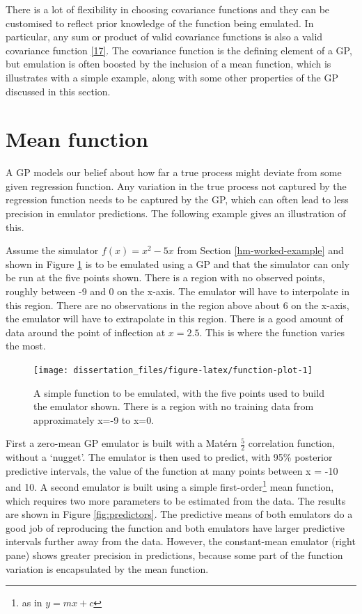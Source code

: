 \documentclass[
  12pt,
  a4paper,
  twoside]{book}
\begin{document}
There is a lot of flexibility in choosing covariance functions and they can be customised to reflect prior knowledge of the function being emulated. In particular, any sum or product of valid covariance functions is also a valid covariance function
\protect\hyperlink{ref-gp4ml}{{[}17{]}}. The covariance function is the defining element of a GP, but emulation is often boosted by the inclusion of a mean function, which is illustrates with a simple example, along with some other properties of the GP discussed in this section.

\hypertarget{mean}{%
\section{Mean function}\label{mean}}

A GP models our belief about how far a true process might deviate from some given regression function. Any variation in the true process not captured by the regression function needs to be captured by the GP, which can often lead to less precision in emulator predictions. The following example gives an illustration of this.

Assume the simulator \(f(x)=x^2 - 5x\) from Section \ref{hm-worked-example} and shown in Figure \ref{fig:function-plot} is to be emulated using a GP and that the simulator can only be run at the five points shown. There is a region with no observed points, roughly between -9 and 0 on the x-axis. The emulator will have to interpolate in this region. There are no observations in the region above about 6 on the x-axis, the emulator will have to extrapolate in this region. There is a good amount of data around the point of inflection at \(x=2.5\). This is where the function varies the most.

\begin{figure}[H]

{\centering \texttt{[image: dissertation\_files/figure-latex/function-plot-1]} 

}

\caption{A simple function to be emulated, with the five points used to build the emulator shown. There is a region with no training data from approximately x=-9 to x=0.}\label{fig:function-plot}
\end{figure}

First a zero-mean GP emulator is built with a Matérn \(\frac{5}{2}\) correlation function, without a `nugget'. The emulator is then used to predict, with 95\% posterior predictive intervals, the value of the function at many points between x = -10 and 10. A second emulator is built using a simple first-order\footnote{as in \(y=mx+c\)} mean function, which requires two more parameters to be estimated from the data. The results are shown in Figure \ref{fig:predictors}. The predictive means of both emulators do a good job of reproducing the function and both emulators have larger predictive intervals further away from the data. However, the constant-mean emulator (right pane) shows greater precision in predictions, because some part of the function variation is encapsulated by the mean function.
\end{document}
